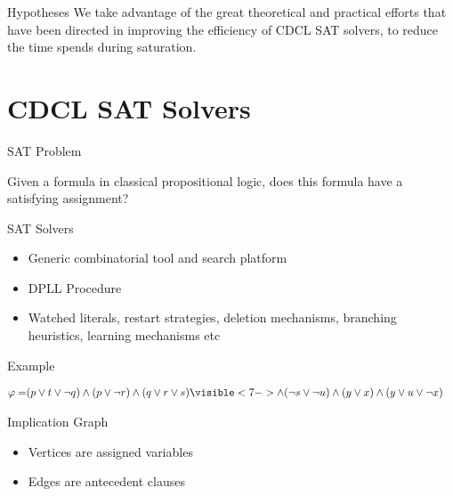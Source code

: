 \documentclass[10pt]{beamer}
\begin{document}
\begin{frame}{Hypotheses}
        We take advantage of the great theoretical and practical efforts that
        have been directed in improving the efficiency of CDCL SAT solvers, to
        reduce the time \ksp spends during saturation.
\end{frame}

\section{CDCL SAT Solvers}
\begin{frame}{SAT Problem}
    \begin{center}
    Given a formula in classical propositional logic, does this formula have a
    satisfying assignment?
    \end{center}
\end{frame}

\begin{frame}{SAT Solvers}
    \begin{itemize}[<+- | visible@+(1)->]
        \item Generic combinatorial tool and search platform %
        \item DPLL Procedure
        \item Watched literals, restart strategies, deletion mechanisms,
            branching heuristics, learning mechanisms etc
    \end{itemize}
\end{frame}

\begin{frame}{Example}
    \begin{center}
    \begin{align*}
        \formula = &(p \lor t \lor \neg q) \land (p \lor \neg r) \land (q \lor r \lor s) \visible<7->{\land (\neg s \lor \neg u) \land (y \lor x) \land (y \lor u \lor \neg x)}
    \end{align*}
    
    \end{center}
\end{frame}

\begin{frame}{Implication Graph}
    \begin{itemize}[<+- | visible@+(1)->]
        \item Vertices are assigned variables
        \item Edges are antecedent clauses 
    \end{itemize}
\end{frame}
\end{document}

